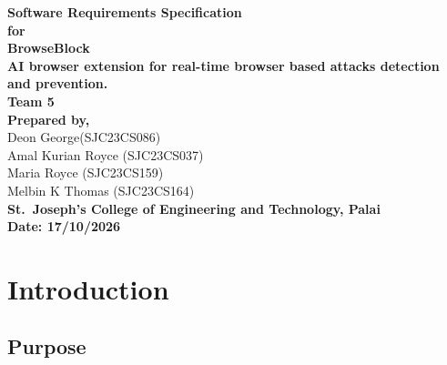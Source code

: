 \documentclass[12pt,a4paper]{report}
\begin{document}
\thispagestyle{empty}
\begin{center}
\vspace*{18mm}
{\LARGE\bfseries Software Requirements Specification\hspace{1.2em}}\\[3.2em]
{\large\bfseries for\hspace{1.2em}}\\[4.2em]
{\fontsize{20}{28}\selectfont\bfseries BrowseBlock\hspace{1.2em}}\\[1.2em]
{\large\bfseries AI browser extension for real-time browser based attacks detection and prevention.\hspace{1.2em}}\\[3.2em]
{\large\bfseries Team 5\hspace{1.2em}}\\[2.6em]
{\normalsize\bfseries Prepared by,\hspace{1.2em}}\\[2.4em]
{\small Deon George(SJC23CS086)\hspace{1.2em}}\\[1.1em]
{\small Amal Kurian Royce (SJC23CS037)\hspace{1.2em}}\\[1.1em]
{\small Maria Royce (SJC23CS159)\hspace{1.2em}}\\[1.1em]
{\small Melbin K Thomas (SJC23CS164)\hspace{1.2em}}\\[3.6em]
{\normalsize\bfseries St.\ Joseph's College of Engineering and Technology, Palai\hspace{1.2em}}\\[3.6em]
 {\normalsize\bfseries Date: 17/10/2026}
\end{center}
\newpage
\renewcommand{\contentsname}{Table Of Contents}
\setcounter{tocdepth}{2}
\setcounter{page}{1}
\tableofcontents
\clearpage
\hypersetup{pageanchor=true}


\chapter{Introduction}

\section{Purpose}
\end{document}
